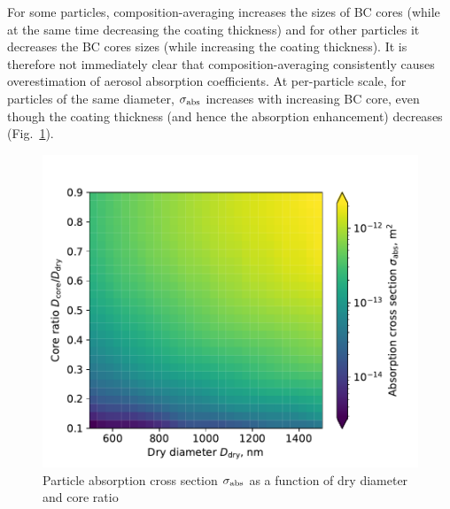 \documentclass[edeposit,fullpage]{uiucthesis2009}
\begin{document}
For some particles, composition-averaging increases the sizes of BC
cores (while at the same time decreasing the coating thickness) and
for other particles it decreases the BC cores sizes (while increasing
the coating thickness). It is therefore not immediately clear that
composition-averaging consistently causes overestimation of aerosol
absorption coefficients. At per-particle scale, for particles of the
same diameter, $\sigma_{\rm abs}$ increases with increasing BC core,
even though the coating thickness (and hence the absorption
enhancement) decreases (Fig.~\ref{fig_sup1}).

\begin{figure}[H]
	\centering
	\includegraphics[scale=0.6]{chap4_figs/fig_sup1.pdf}
	\caption{Particle absorption cross section $\sigma_{\rm abs}$ as a function of dry diameter and core ratio}
	\label{fig_sup1}
\end{figure}

\end{document}
